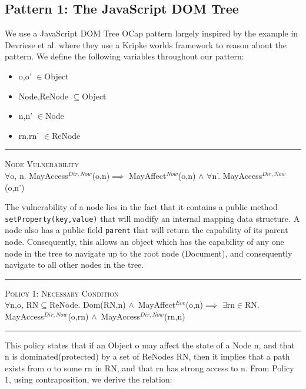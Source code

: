 \documentclass[a4paper,11pt, twoside,twocolumn]{article}
\newenvironment{logic}[1][null]
{\begin{flushleft} \small \label{#1}}
{\end{flushleft}}
\newcommand{\loin}{$\in$}
\newcommand{\loforall}{$\forall$}
\newcommand{\loexists}{$\exists$}
\newcommand{\loand}{$\land$}
\newcommand{\losubseteq}{$\subseteq$}
\newcommand{\loimplies}{$\implies$}
\newcommand{\ablock} {\null\qquad}
\begin{document}
\subsection{Pattern 1: The JavaScript DOM Tree}
We use a JavaScript DOM Tree OCap pattern largely inspired by the example in Devriese et al.\cite{devriese2016} where they use a Kripke worlds framework to reason about the pattern. We define the following variables throughout our pattern:
\begin{itemize}
\item o,o' \loin Object
\item Node,ReNode \losubseteq Object
\item n,n' \loin Node
\item rn,rn' \loin ReNode
\end{itemize}

\begin{logic}[NodeVul]
\hrule\null
\textsc{\normalsize *Node Vulnerability}\\
\loforall o, n. MayAccess$^{Dir,Now}$(o,n)\linebreak \ablock\ablock \loimplies \linebreak
\ablock \ablock MayAffect$^{Now}$(o,n) \loand \linebreak
\ablock \ablock \loforall n'. MayAccess$^{Dir,Now}$(o,n')
\end{logic}
The vulnerability of a node lies in the fact that it contains a public method \texttt{setProperty(key,value)} that will modify an internal mapping data structure. A node also has a public field \texttt{parent} that will return the capability of its parent node. Consequently, this allows an object which has the capability of any one node in the tree to navigate up to the root node (Document), and consequently navigate to all other nodes in the tree.

\begin{logic}[NodeP1]
\hrule\null
\textsc{\normalsize *Policy 1: Necessary Condition}\\
\loforall n,o, RN\losubseteq ReNode.\linebreak
\ablock Dom(RN,n) \loand\ MayAffect$^{Eve}$(o,n)\linebreak \ablock\loimplies \linebreak
\ablock \loexists rn\loin RN. MayAccess$^{Dir,Now}$(o,rn)\linebreak
\ablock \ablock \:\:\:\: \loand\ MayAccess$^{Dir,Now}$(rn,n)
\end{logic}
\hrule\null
This policy states that if an Object o may affect the state of a Node n, and that n is dominated(protected) by a set of ReNodes RN, then it implies that a path exists from o to some rn in RN, and that rn has strong access to n.
From Policy 1, using contraposition, we derive the relation:
\end{document}
